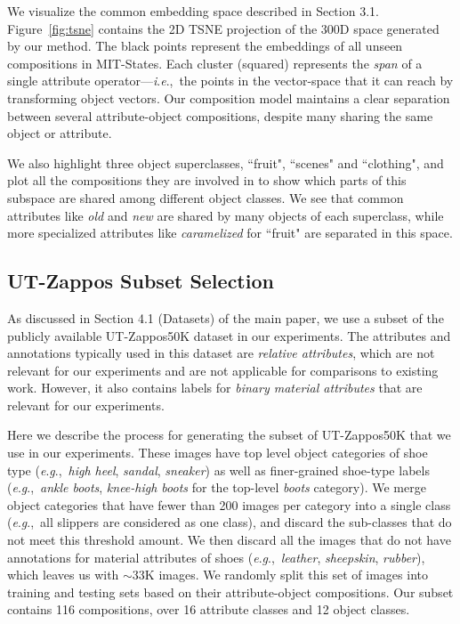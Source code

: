 \documentclass[runningheads]{llncs}
\newcommand{\ie}{\textit{i}.\textit{e}.,~}
\newcommand{\eg}{\textit{e}.\textit{g}.,~}
\newcommand{\reffig}[1]{Figure~\ref{#1}}
\begin{document}
We visualize the common embedding space described in Section 3.1. \reffig{fig:tsne} contains the 2D TSNE projection of the 300D space generated by our method. The black points represent the embeddings of all unseen compositions in MIT-States. Each cluster (squared) represents the \emph{span} of a single attribute operator---\ie the points in the vector-space that it can reach by transforming object vectors. Our composition model maintains a clear separation between several attribute-object compositions, despite many sharing the same object or attribute. 

We also highlight three object superclasses, ``fruit", ``scenes" and ``clothing", and plot all the compositions they are involved in to show which parts of this subspace are shared among different object classes. We see that common attributes like \emph{old} and \emph{new} are shared by many objects of each superclass, while more specialized attributes like \emph{caramelized} for ``fruit" are separated in this space.


\subsection*{UT-Zappos Subset Selection}

As discussed in Section 4.1 (Datasets) of the main paper, we use a subset of the publicly available UT-Zappos50K dataset in our experiments.  The attributes and annotations typically used in this dataset are \emph{relative attributes}, which are not relevant for our experiments and are not applicable for comparisons to existing work.  However, it also contains labels for \emph{binary material attributes} that are relevant for our experiments.

Here we describe the process for generating the subset of UT-Zappos50K  that we use in our experiments. These images have top level object categories of shoe type (\eg \emph{high heel}, \emph{sandal}, \emph{sneaker}) as well as  finer-grained shoe-type labels (\eg \emph{ankle boots}, \emph{knee-high boots} for the top-level \emph{boots} category). We merge object categories that have fewer than 200 images per category into a single class (\eg all slippers are considered as one class), and discard the sub-classes that do not meet this threshold amount. We then discard all the images that do not have annotations for material attributes of shoes (\eg \emph{leather}, \emph{sheepskin}, \emph{rubber}), which leaves us with $\sim$33K images. We randomly split this set of images into training and testing sets based on their attribute-object compositions. Our subset contains 116 compositions, over 16 attribute classes and 12 object classes.
\end{document}
